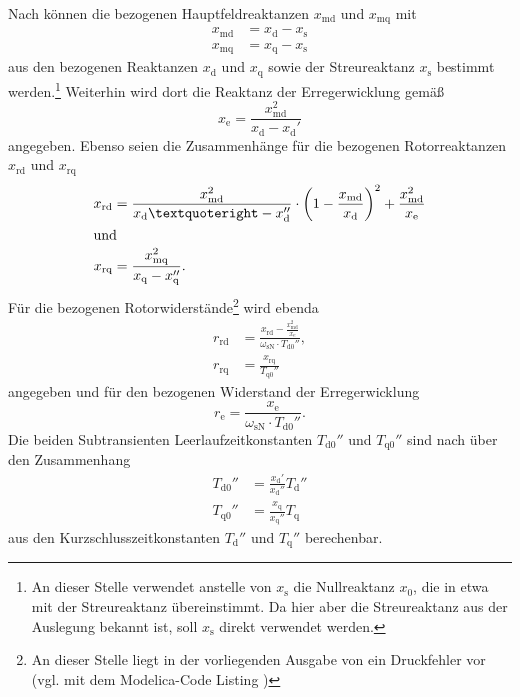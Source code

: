 Nach \cite[S. 264]{kralModelicaObjektorientierteModellbildung2019}
können die bezogenen Hauptfeldreaktanzen \(x_{\mathrm{md}}\) und
\(x_{\mathrm{mq}}\) mit
\begin{align}
x_{\mathrm{md}} &= x_{\mathrm{d}} - x_{\mathrm{s}} \\
x_{\mathrm{mq}} &= x_{\mathrm{q}} - x_{\mathrm{s}}
\end{align}
aus den bezogenen Reaktanzen \(x_{\mathrm{d}}\) und \(x_{\mathrm{q}}\)
sowie der Streureaktanz \(x_{\mathrm{s}}\) bestimmt werden.\footnote{An
  dieser Stelle verwendet
  \cite[]{kralModelicaObjektorientierteModellbildung2019} anstelle von
  \(x_{\mathrm{s}}\) die Nullreaktanz \(x_{\mathrm{0}}\), die in etwa
  mit der Streureaktanz übereinstimmt. Da hier aber die Streureaktanz
  aus der Auslegung bekannt ist, soll \(x_{\mathrm{s}}\) direkt
  verwendet werden.} Weiterhin wird dort die Reaktanz der
Erregerwicklung gemäß
\begin{equation}
x_{\mathrm{e}} = \frac{x_{\mathrm{md}}^2}{x_{\mathrm{d}}-x_{\mathrm{d}}'}
\end{equation}
angegeben. Ebenso seien die Zusammenhänge für die bezogenen
Rotorreaktanzen \(x_{\mathrm{rd}}\) und \(x_{\mathrm{rq}}\)
\begin{align}
x_{\mathrm{rd}} &= \frac{x_{\mathrm{md}}^2}{x_{\mathrm{d}}’ - x_{\mathrm{d}}''}\cdot \left( 1-\frac{x_{\mathrm{md}}}{x_{\mathrm{d}}}\right)^2 + \frac{x_{\mathrm{md}}^2}{x_{\mathrm{e}}}\\
\intertext{und}
x_{\mathrm{rq}} &= \frac{x_{\mathrm{mq}}^2}{x_{\mathrm{q}} - x_{\mathrm{q}}''}.
\end{align}
Für die bezogenen Rotorwiderstände\footnote{An dieser Stelle liegt in
  der vorliegenden Ausgabe von
  \cite[]{kralModelicaObjektorientierteModellbildung2019} ein
  Druckfehler vor (vgl. mit dem Modelica-Code Listing
  \cite[S. 266]{kralModelicaObjektorientierteModellbildung2019})} wird
ebenda
\begin{align}
r_{\mathrm{rd}} &= \frac{x_{\mathrm{rd}} - \frac{x_{\mathrm{md}}^2}{x_{\mathrm{e}}}}{\omega_{\mathrm{sN}}\cdot T_{\mathrm{d0}}''}, \\
r_{\mathrm{rq}} &= \frac{x_{\mathrm{rq}}}{T_{\mathrm{q0}}''}
\end{align}
angegeben und für den bezogenen Widerstand der Erregerwicklung
 \begin{equation}
r_{\mathrm{e}} = \frac{x_{\mathrm{e}}}{\omega_{\mathrm{sN}}\cdot T_{\mathrm{d0}}''}.
\end{equation}
Die beiden Subtransienten Leerlaufzeitkonstanten \(T_{\mathrm{d0}}''\)
und \(T_{\mathrm{q0}}''\) sind nach
\cite[S. 222ff.]{bonfertBetriebsverhaltenSynchronmaschine1962} über den
Zusammenhang
\begin{align}
T_{\mathrm{d0}}'' &= \frac{x_{\mathrm{d}}'}{x_{\mathrm{d}}''}T_{\mathrm{d}}'' \\
T_{\mathrm{q0}}'' &= \frac{x_{\mathrm{q}}}{x_{\mathrm{q}}''}T_{\mathrm{q}}
\end{align}
aus den Kurzschlusszeitkonstanten \(T_{\mathrm{d}}''\) und
\(T_{\mathrm{q}}''\) berechenbar.

